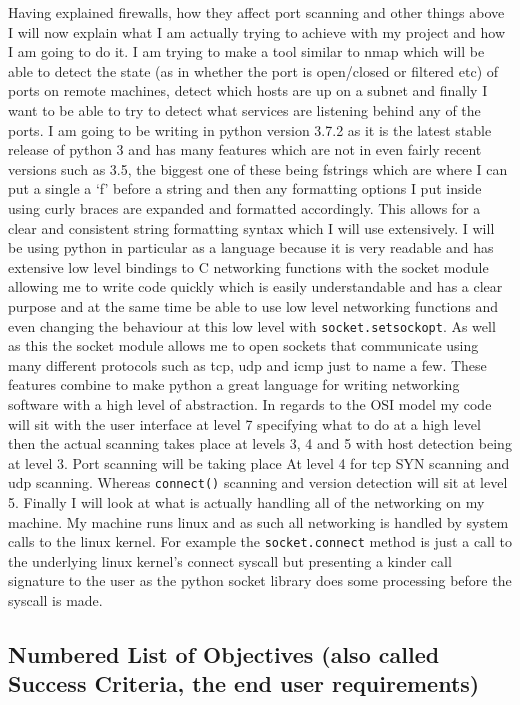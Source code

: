 \documentclass[titlepage]{article}
\let\Oldsubsection\subsection{}
\renewcommand{\subsection}{\FloatBarrier\Oldsubsection}
\begin{document}
Having explained firewalls, how they affect port scanning and other things above I will now
explain what I am actually trying to achieve with my project and how I am going to do it.
I am trying to make a tool similar to nmap which will be able to detect the state (as in whether
the port is open/closed or filtered etc) of ports on remote machines, detect which hosts are up on
a subnet and finally I want to be able to try to detect what services are listening behind any of
the ports. I am going to be writing in python version 3.7.2 as it is the latest stable release
of python 3 and has many features which are not in even fairly recent versions such as 3.5, 
the biggest one of these being fstrings which are where I can put a single a `f' before a string
and then any formatting options I put inside using curly braces are expanded and formatted
accordingly. This allows for a clear and consistent string formatting syntax which I will use
extensively. I will be using python in particular as a language because it is very readable and
has extensive low level bindings to C networking functions with the socket module
allowing me to write code quickly which is easily understandable and has a clear purpose and at
the same time be able to use low level networking functions and even changing the behaviour at
this low level with \verb|socket.setsockopt|. As well as this the socket module allows me to
open sockets that communicate using many different protocols such as \gls{tcp}, \gls{udp} and
\gls{icmp} just to name a few. These features combine to make python a great language for writing
networking software with a high level of abstraction. In regards to the OSI model my code will
sit with the user interface at level 7 specifying what to do at a high level then the actual
scanning takes place at levels 3, 4 and 5 with host detection being at level 3. Port scanning will
be taking place At level 4 for \gls{tcp} SYN scanning and \gls{udp} scanning. Whereas \verb|connect()|
scanning and version detection will sit at level 5. Finally I will look at what is actually
handling all of the networking on my machine. My machine runs linux and as such all networking
is handled by system calls to the linux kernel. For example the \verb|socket.connect| method
is just a call to the underlying linux kernel's connect syscall but presenting a kinder call
signature to the user as the python socket library does some processing before the syscall is made.

\subsection{Numbered List of Objectives (also called Success Criteria, the end user requirements)}
\end{document}
